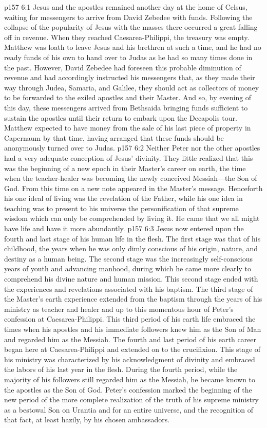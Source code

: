 \vs p157 6:1 Jesus and the apostles remained another day at the home of Celsus, waiting for messengers to arrive from David Zebedee with funds. Following the collapse of the popularity of Jesus with the masses there occurred a great falling off in revenue. When they reached Caesarea\hyp{}Philippi, the treasury was empty. Matthew was loath to leave Jesus and his brethren at such a time, and he had no ready funds of his own to hand over to Judas as he had so many times done in the past. However, David Zebedee had foreseen this probable diminution of revenue and had accordingly instructed his messengers that, as they made their way through Judea, Samaria, and Galilee, they should act as collectors of money to be forwarded to the exiled apostles and their Master. And so, by evening of this day, these messengers arrived from Bethsaida bringing funds sufficient to sustain the apostles until their return to embark upon the Decapolis tour. Matthew expected to have money from the sale of his last piece of property in Capernaum by that time, having arranged that these funds should be anonymously turned over to Judas.
\pc \vs p157 6:2 Neither Peter nor the other apostles had a very adequate conception of Jesus’ divinity. They little realized that this was the beginning of a new epoch in their Master’s career on earth, the time when the teacher\hyp{}healer was becoming the newly conceived Messiah---the Son of God. From this time on a new note appeared in the Master’s message. Henceforth his one ideal of living was the revelation of the Father, while his one idea in teaching was to present to his universe the personification of that supreme wisdom which can only be comprehended by living it. He came that we all might have life and have it more abundantly.
\vs p157 6:3 Jesus now entered upon the fourth and last stage of his human life in the flesh. The first stage was that of his childhood, the years when he was only dimly conscious of his origin, nature, and destiny as a human being. The second stage was the increasingly self\hyp{}conscious years of youth and advancing manhood, during which he came more clearly to comprehend his divine nature and human mission. This second stage ended with the experiences and revelations associated with his baptism. The third stage of the Master’s earth experience extended from the baptism through the years of his ministry as teacher and healer and up to this momentous hour of Peter’s confession at Caesarea\hyp{}Philippi. This third period of his earth life embraced the times when his apostles and his immediate followers knew him as the Son of Man and regarded him as the Messiah. The fourth and last period of his earth career began here at Caesarea\hyp{}Philippi and extended on to the crucifixion. This stage of his ministry was characterized by his acknowledgment of divinity and embraced the labors of his last year in the flesh. During the fourth period, while the majority of his followers still regarded him as the Messiah, he became known to the apostles as the Son of God. Peter’s confession marked the beginning of the new period of the more complete realization of the truth of his supreme ministry as a bestowal Son on Urantia and for an entire universe, and the recognition of that fact, at least hazily, by his chosen ambassadors.
